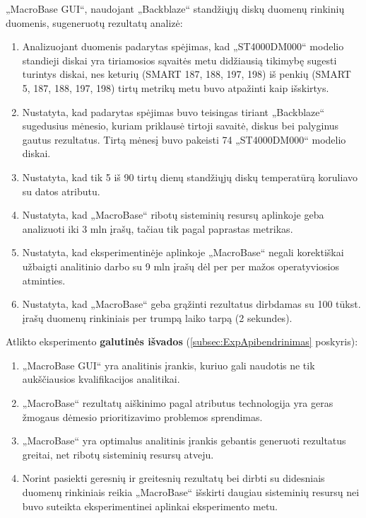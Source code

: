 \documentclass{VUMIFPSkursinis}
\begin{document}
„MacroBase GUI“, naudojant „Backblaze“ standžiųjų diskų duomenų rinkinių duomenis, sugeneruotų rezultatų analizė:
\begin{enumerate}
\item Analizuojant duomenis padarytas spėjimas, kad „ST4000DM000“ modelio standieji diskai yra  tiriamosios sąvaitės metu didžiausią tikimybę sugesti turintys diskai, nes keturių (SMART 187, 188, 197, 198) iš penkių (SMART 5, 187, 188, 197, 198) tirtų metrikų metu buvo atpažinti kaip išskirtys.

\item Nustatyta, kad padarytas spėjimas buvo teisingas tiriant „Backblaze“ sugedusius mėnesio, kuriam priklausė tirtoji savaitė, diskus bei palyginus gautus rezultatus. Tirtą mėnesį buvo pakeisti 74 „ST4000DM000“ modelio diskai.

\item Nustatyta, kad tik 5 iš 90 tirtų dienų standžiųjų diskų temperatūrą koruliavo su datos atributu.

\item Nustatyta, kad „MacroBase“ ribotų sisteminių resursų aplinkoje geba analizuoti iki 3 mln įrašų, tačiau tik pagal paprastas metrikas.

\item Nustatyta, kad eksperimentinėje aplinkoje „MacroBase“ negali korektiškai užbaigti analitinio darbo su 9 mln įrašų dėl per per mažos operatyviosios atminties.

\item Nustatyta, kad „MacroBase“ geba grąžinti rezultatus dirbdamas su 100 tūkst. įrašų duomenų rinkiniais per trumpą laiko tarpą (2 sekundes).
\end{enumerate}

Atlikto eksperimento \textbf{galutinės išvados} (\ref{subsec:ExpApibendrinimas} poskyris):
\begin{enumerate}
\item „MacroBase GUI“ yra analitinis įrankis, kuriuo gali naudotis ne tik aukščiausios kvalifikacijos analitikai.

\item „MacroBase“ rezultatų aiškinimo pagal atributus technologija yra geras žmogaus dėmesio prioritizavimo problemos sprendimas.

\item „MacroBase“ yra optimalus analitinis įrankis gebantis generuoti rezultatus greitai, net ribotų sisteminių resursų atveju.

\item Norint pasiekti geresnių ir greitesnių rezultatų bei dirbti su didesniais duomenų rinkiniais reikia „MacroBase“ išskirti daugiau sisteminių resursų nei buvo suteikta eksperimentinei aplinkai eksperimento metu.
\end{enumerate}
\end{document}
